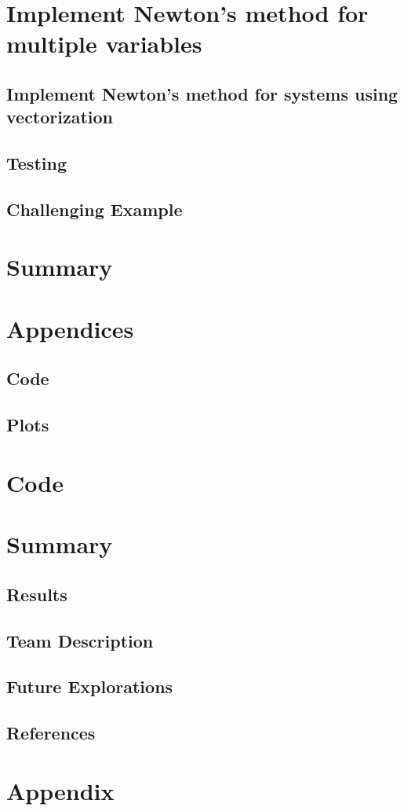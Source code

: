 \documentclass[11pt]{article}
\begin{document}
\section{Implement Newton's method for multiple variables}

\subsection{Implement Newton's method for systems using vectorization}

\subsection{Testing}

\subsection{Challenging Example}

\section{Summary}

\section{Appendices}

\subsection{Code}

\subsection{Plots}





\section{Code}



\section{Summary}
\subsection{Results}


\subsection{Team Description}


\subsection{Future Explorations}


\subsection{References}

\section*{Appendix}
\end{document}
